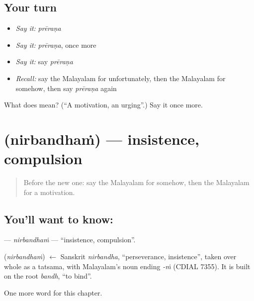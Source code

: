 \subsection*{Your turn}
\begin{itemize}
\raggedright
  \item \emph{Say it:} \emph{prēraṇa}
  \item \emph{Say it:} \emph{prēraṇa}, once more
  \item \emph{Say it:} say \emph{prēraṇa}
  \item \emph{Recall:} say the Malayalam for unfortunately, then the Malayalam for somehow, then say \emph{prēraṇa} again
\end{itemize}

\begin{tcolorbox}[breakable,colback=teal!4,colframe=teal!35!black,title={Before you move on}]
What does  mean? (\textquotedblleft{}A motivation, an urging\textquotedblright{}.) Say it once more.
\end{tcolorbox}
\section[\texorpdfstring{\ml{നിർബന്ധം} (nirbandhaṁ)}{നിർബന്ധം (nirbandhaṁ)}]{ (nirbandhaṁ) — insistence, compulsion}

\label{lesson:ML-C202-nirbandham}



\begin{quote}
Before the new one: say the Malayalam for somehow, then the Malayalam for a motivation.
\end{quote}

\subsection*{You'll want to know: }
\textbf{} — \emph{nirbandhaṁ} — \textquotedblleft{}insistence, compulsion\textquotedblright{}.

\begin{cousinweb}
\textbf{} (\emph{nirbandhaṁ}) $\leftarrow$ Sanskrit \emph{nirbandha}, \textquotedblleft{}perseverance, insistence\textquotedblright{}, taken over whole as a tatsama, with Malayalam's noun ending \emph{-ṁ} (CDIAL 7355). It is built on the root \emph{bandh}, \textquotedblleft{}to bind\textquotedblright{}.
\end{cousinweb}

\begin{grammarlens}[title={What you've built}]
One more word for this chapter.
\end{grammarlens}

